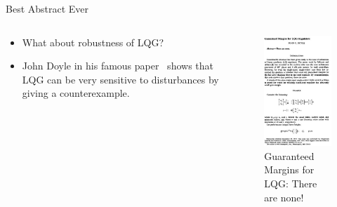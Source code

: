 \documentclass[handout]{beamer}
\begin{document}
\begin{frame}{Best Abstract Ever}
\begin{columns}
\begin{column}{.49\textwidth}
  \begin{itemize}
   \item What about robustness of LQG?
   \item John Doyle in his famous paper~\cite{Doyle78} shows that LQG can be very sensitive to disturbances by giving a counterexample.
  \end{itemize}
\end{column}
\begin{column}{.49\textwidth}
  \begin{figure}
  \center
  \includegraphics[scale=0.6]{guaranteedMarginsForLQG.jpg}			
  \caption{Guaranteed Margins for LQG: There are none!}
  \end{figure}
\end{column}
\end{columns}
\end{frame}
%
\end{document}
